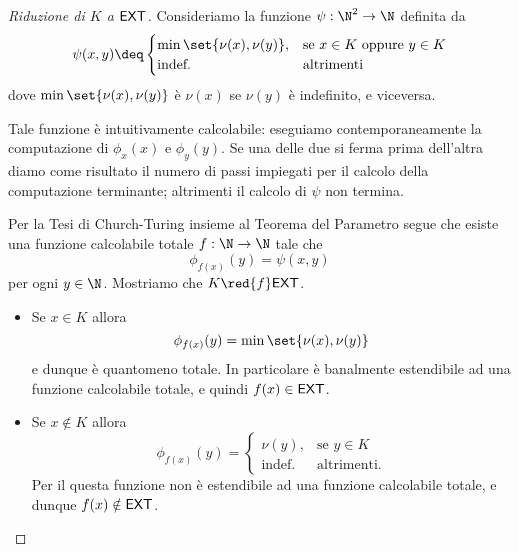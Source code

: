 \documentclass[
    a4paper,
    language=italian,
    oneside,
    10pt,
    article,
    thmstyle=professional
]{notes}
\newcommand{\EXT}{\normalfont\textsf{EXT}}
\newcommand{\indef}{\text{indef.}}
\newcommand{\altr}{\text{altrimenti}}
\begin{document}
    \begin{proof}[Riduzione di $K$ a $\EXT$]
        Consideriamo la funzione $\psi : \N^2 \to \N$ definita da \[
            \psi(x, y) \deq \begin{cases}
                \min\set{\nu(x), \nu(y)}, &\text{se $x \in K$ oppure $y \in K$}\\
                \indef &\altr
            \end{cases}
        \] dove $\min\set{\nu(x), \nu(y)}$ è $\nu(x)$ se $\nu(y)$ è indefinito, e viceversa.

        Tale funzione è intuitivamente calcolabile: eseguiamo
        contemporaneamente la computazione di $\phi_x(x)$ e $\phi_y(y)$.
        Se una delle due si ferma prima dell'altra diamo come 
        risultato il numero di passi impiegati per il calcolo della
        computazione terminante; altrimenti il calcolo di $\psi$ non termina.
        
        Per la Tesi di Church-Turing insieme al Teorema del Parametro
        segue che esiste una funzione calcolabile totale $f : \N \to \N$
        tale che \[
            \phi_{f(x)}(y) = \psi(x, y)
        \] per ogni $y \in \N$. Mostriamo che $K \red{f} \EXT$.
        \begin{itemize}[label={\tiny\raisebox{1ex}{\textbullet}}]
            \item Se $x \in K$ allora \[
                \phi_{f(x)}(y) = \min\set{\nu(x), \nu(y)}
            \] e dunque è quantomeno totale. In particolare è banalmente
            estendibile ad una funzione calcolabile totale, 
            e quindi $f(x) \in \EXT$. 
            \item Se $x \notin K$ allora \[
                \phi_{f(x)}(y) = \begin{cases}
                    \nu(y), &\text{se $y \in K$}\\
                    \indef  &\altr.
                \end{cases}
            \] Per il  questa funzione non è estendibile
            ad una funzione calcolabile totale, e dunque $f(x) \notin \EXT$. \qedhere
        \end{itemize}  
    \end{proof}

    \medskip
\end{document}
